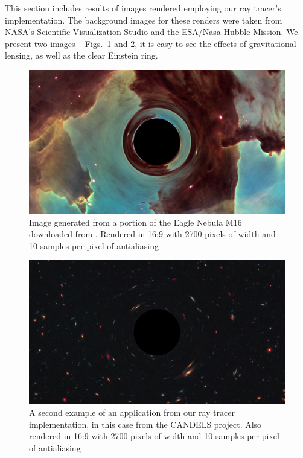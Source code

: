 This section includes results of images rendered employing our ray tracer's implementation.
The background images for these renders were taken from NASA's Scientific Visualization Studio and the ESA/Nasa Hubble Mission.
We present two images -- Figs.~\ref{fig:eagle} and \ref{fig:starry}, it is easy to see the effects of gravitational lensing, as well as the clear Einstein ring. 

\begin{figure}[h]
  \centering
  \includegraphics[width=0.8\linewidth]{figs/eagle_render}
  \caption{Image generated from a portion of the Eagle Nebula M16 downloaded from \cite{esa-pillars}. Rendered in 16:9 with 2700 pixels of width and 10 samples per pixel of antialiasing}
  \label{fig:eagle}
\end{figure}


\begin{figure}[h]
  \centering
  \includegraphics[width=0.8\linewidth]{figs/starry_render}
  \caption{A second example of an application from our ray tracer implementation,
	in this case from the CANDELS project\cite{candels-nasa_svs}. Also rendered in 16:9 with 2700 pixels of width and 10 samples per pixel of antialiasing}
  \label{fig:starry}
\end{figure}





